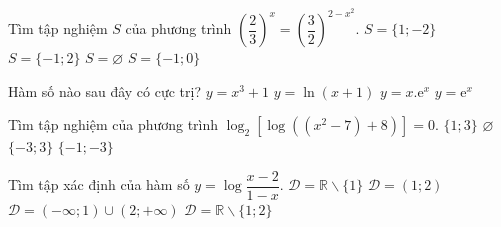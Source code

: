\begin{ex}%
Tìm tập nghiệm $S$ của phương trình $\left(\dfrac{2}{3}\right)^x=\left(\dfrac{3}{2}\right)^{2-x^2}$.
\choice
{$S=\{1; -2\}$}
{\True $S=\{-1; 2\}$}
{$S=\varnothing$}
{$S=\{-1; 0\}$}
\end{ex}

\begin{ex}%
Hàm số nào sau đây có cực trị?
\choice
{$y=x^3+1$}
{$y=\ln(x+1)$}
{\True $y=x.\mathrm{e}^x$}
{$y=\mathrm{e}^x$}
\end{ex}

\begin{ex}%
Tìm tập nghiệm của phương trình $\log_2\left[\log\left((x^2-7)+8\right)\right]=0$.
\choice
{$\{1; 3\}$}
{$\varnothing$}
{\True $\{-3; 3\}$}
{$\{-1; -3\}$}
\end{ex}

\begin{ex}%
Tìm tập xác định của hàm số $y=\log\dfrac{x-2}{1-x}$.
\choice
{$\mathscr{D}=\mathbb{R}\backslash\{1\}$}
{\True $\mathscr{D} =(1; 2)$}
{$\mathscr{D}=(-\infty; 1)\cup (2; +\infty)$}
{$\mathscr{D}=\mathbb{R}\backslash\{1; 2\}$}
\end{ex}

